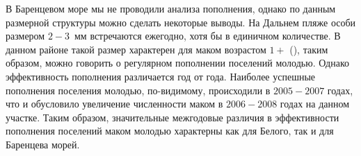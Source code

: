 В Баренцевом море мы не проводили анализа пополнения, однако по данным размерной структуры можно сделать некоторые выводы.
На Дальнем пляже особи размером $2-3$~мм встречаются ежегодно, хотя бы в единичном количестве.
В данном районе такой размер характерен для маком возрастом $1+$ (\cite{Nazarova_et_al_2010}), таким образом, можно говорить о регулярном пополнении поселений молодью. 
Однако эффективность пополнения различается год от года. 
Наиболее успешные пополнения поселения молодью, по-видимому, происходили в $2005-2007$ годах, что и обусловило увеличение численности маком в $2006-2008$ годах на данном участке.
Таким образом, значительные межгодовые различия в эффективности пополнения поселений маком молодью характерны как для Белого, так и для Баренцева морей.

